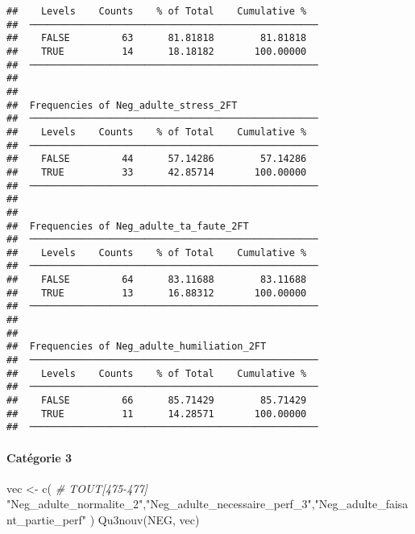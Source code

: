 \documentclass[
]{article}
\newenvironment{Shaded}{\begin{snugshade}}{\end{snugshade}}
\newcommand{\CommentTok}[1]{\textcolor[rgb]{0.56,0.35,0.01}{\textit{#1}}}
\newcommand{\FunctionTok}[1]{\textcolor[rgb]{0.00,0.00,0.00}{#1}}
\newcommand{\NormalTok}[1]{#1}
\newcommand{\OtherTok}[1]{\textcolor[rgb]{0.56,0.35,0.01}{#1}}
\newcommand{\StringTok}[1]{\textcolor[rgb]{0.31,0.60,0.02}{#1}}
\begin{document}
\begin{verbatim}
##    Levels    Counts    % of Total    Cumulative %   
##  ────────────────────────────────────────────────── 
##    FALSE         63      81.81818        81.81818   
##    TRUE          14      18.18182       100.00000   
##  ────────────────────────────────────────────────── 
## 
## 
##  Frequencies of Neg_adulte_stress_2FT               
##  ────────────────────────────────────────────────── 
##    Levels    Counts    % of Total    Cumulative %   
##  ────────────────────────────────────────────────── 
##    FALSE         44      57.14286        57.14286   
##    TRUE          33      42.85714       100.00000   
##  ────────────────────────────────────────────────── 
## 
## 
##  Frequencies of Neg_adulte_ta_faute_2FT             
##  ────────────────────────────────────────────────── 
##    Levels    Counts    % of Total    Cumulative %   
##  ────────────────────────────────────────────────── 
##    FALSE         64      83.11688        83.11688   
##    TRUE          13      16.88312       100.00000   
##  ────────────────────────────────────────────────── 
## 
## 
##  Frequencies of Neg_adulte_humiliation_2FT          
##  ────────────────────────────────────────────────── 
##    Levels    Counts    % of Total    Cumulative %   
##  ────────────────────────────────────────────────── 
##    FALSE         66      85.71429        85.71429   
##    TRUE          11      14.28571       100.00000   
##  ──────────────────────────────────────────────────
\end{verbatim}

\hypertarget{catuxe9gorie-3-5}{%
\paragraph{Catégorie 3}\label{catuxe9gorie-3-5}}

\begin{Shaded}
\begin{Highlighting}[]
\NormalTok{vec }\OtherTok{\textless{}{-}} \FunctionTok{c}\NormalTok{(   }\CommentTok{\# TOUT[475{-}477]}
  \StringTok{"Neg\_adulte\_normalite\_2"}\NormalTok{,}\StringTok{"Neg\_adulte\_necessaire\_perf\_3"}\NormalTok{,}\StringTok{"Neg\_adulte\_faisant\_partie\_perf"}
\NormalTok{)}
\FunctionTok{Qu3nouv}\NormalTok{(NEG, vec)}
\end{Highlighting}
\end{Shaded}
\end{document}
